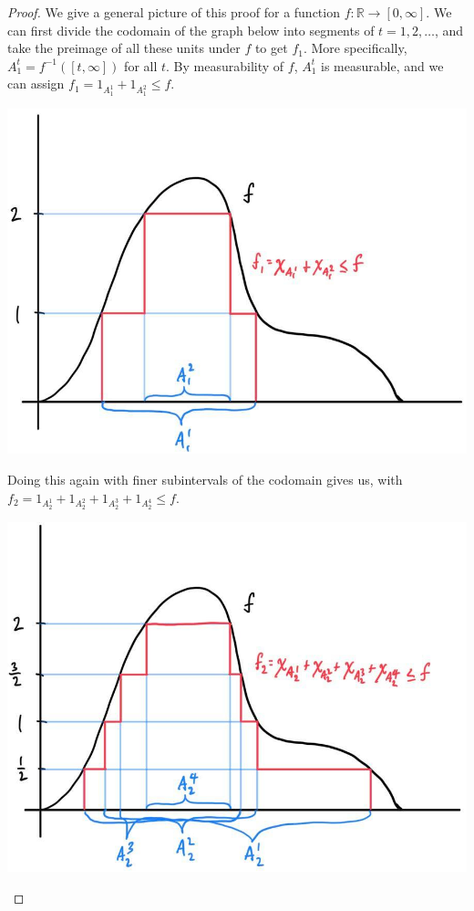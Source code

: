 \documentclass{article}
\begin{document}
      \begin{proof}
        We give a general picture of this proof for a function $f: \mathbb{R} \longrightarrow [0, \infty]$. We can first divide the codomain of the graph below into segments of $t = 1, 2, \ldots$, and take the preimage of all these units under $f$ to get $f_1$. More specifically, $A_1^t = f^{-1} ([t, \infty])$ for all $t$. By measurability of $f$, $A_1^t$ is measurable, and we can assign $f_1 = 1_{A^1_1} + 1_{A_1^2} \leq f$. 
        \begin{center}
          \includegraphics[scale=0.23]{img/Lebesgue_1.jpg}
        \end{center}
        Doing this again with finer subintervals of the codomain gives us, with $f_2 = 1_{A_2^1} + 1_{A_2^2} + 1_{A_2^3} + 1_{A_2^4} \leq f$. 
        \begin{center}
          \includegraphics[scale=0.23]{img/Lebesgue_2.jpg}

\end{center}
\end{proof}
\end{document}
